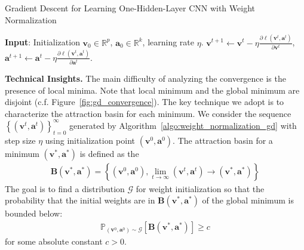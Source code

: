 \documentclass{article}
\newcommand{\firstlayerWN}{v}
\newcommand{\secondlayer}{a}
\newcommand{\vect}[1]{\mathbf{#1}}
\newcommand{\prob}{\mathbb{P}}
\newcommand{\ab}{\mathbf{B}}
\begin{document}
\begin{algorithm}[tb]
	\caption{Gradient Descent for Learning One-Hidden-Layer CNN with Weight Normalization}
    \label{algo:weight_normalization_gd}
	\begin{algorithmic}[1]
		\STATE \textbf{Input}: Initialization $\vect{v}_0\in\mathbb{R}^p$, $\vect{\secondlayer}_0 \in \mathbb{R}^{k}$, learning rate $\eta$.
		\STATE $\vect{\firstlayerWN}^{t+1}\leftarrow \vect{\firstlayerWN}^t - \eta\frac{\partial \ell\left(\vect{\firstlayerWN}^t,\vect{\secondlayer}^t\right)}{\partial \vect{\firstlayerWN}^t}$,
		\STATE $\vect{\secondlayer}^{t+1} \leftarrow \vect{\secondlayer}^t - \eta\frac{\partial \ell\left(\vect{\firstlayerWN}^{t},\vect{\secondlayer}^t\right)}{\partial \vect{\secondlayer}^t}$.
		\ENDFOR
	\end{algorithmic}
\end{algorithm}\textbf{Technical Insights.}\label{sec:technique}
The main difficulty of analyzing the convergence is the presence of local minima.
Note that local minimum and the global minimum are disjoint (c.f. Figure~\ref{fig:gd_convergence}).
The key technique we adopt is to characterize the attraction basin for each minimum.
We consider the sequence $\left\{\left(\vect{\firstlayerWN}^t,\vect{\secondlayer}^t\right)\right\}_{t=0}^{\infty}$ generated by Algorithm~\ref{algo:weight_normalization_gd} with step size $\eta$ using initialization point $\left(\vect{\firstlayerWN}^0,\vect{\secondlayer}^0\right)$.
The attraction basin for a minimum $\left(\vect{\firstlayerWN}^*,\vect{\secondlayer}^*\right)$ is defined as the \begin{align*}
	\ab\left(\vect{\firstlayerWN}^*,\vect{\secondlayer}^*\right) = \left\{\left(\vect{\firstlayerWN}^0,\vect{\secondlayer}^0\right), \lim\limits_{t\rightarrow \infty}\left(\vect{\firstlayerWN}^t,\vect{\secondlayer}^t\right) \rightarrow \left(\vect{\firstlayerWN}^*,\vect{\secondlayer}^*\right)\right\}
\end{align*}
The goal is to find a distribution $\mathcal{G}$ for weight initialization so that the probability that the initial weights are in $\ab\left(\vect{\firstlayerWN}^*,\vect{\secondlayer}^*\right)$ of the global minimum is bounded below:
\begin{align*}
	\prob_{\left(\vect{\firstlayerWN}^0, \vect{\secondlayer}^0\right)\sim \mathcal{G}}\left[\ab\left(\vect{\firstlayerWN}^*,\vect{\secondlayer}^*\right)\right] \ge c
\end{align*} for some absolute constant $c > 0$.
\end{document}
